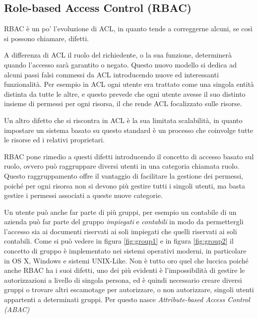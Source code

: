 \subsection*{Role-based Access Control (RBAC)} %
\label{sub:role_based_access_control}

RBAC è un po' l'evoluzione di ACL, in quanto tende a correggerne alcuni, se così si possono chiamare, difetti. \par
A differenza di ACL il ruolo del richiedente, o la sua funzione, determinerà quando l'accesso sarà garantito o negato.
Questo nuovo modello si dedica ad alcuni passi falsi commessi da ACL introducendo nuove ed interessanti funzionalità. Per esempio in ACL ogni utente era trattato come una singola entità distinta da tutte le altre, e questo prevede che ogni utente avesse il suo distinto insieme di permessi per ogni risorsa, il che rende ACL focalizzato sulle risorse. \par
Un altro difetto che si riscontra in ACL è la sua limitata scalabilità, in quanto 
impostare un sistema basato su questo standard è un processo che coinvolge tutte le risorse ed i relativi proprietari.\\ \par
RBAC pone rimedio a questi difetti introducendo il concetto di accesso basato sul ruolo, ovvero può raggruppare diversi utenti in una categoria chiamata ruolo. 
Questo raggruppamento offre il vantaggio di facilitare la gestione dei permessi, poiché per ogni risorsa non si devono più gestire tutti i singoli utenti, ma basta gestire i permessi associati a queste nuove categorie.\\ \par
Un utente può anche far parte di più gruppi, per esempio un contabile di un azienda può far parte del gruppo \textit{impiegati} e \textit{contabili} in modo da permettergli l'accesso sia ai documenti riservati ai soli impiegati che quelli riservati ai soli contabili.
Come si può vedere in figura \ref{fig:group1} e in figura \ref{fig:group2} il concetto di gruppo è implementato nei sistemi operativi moderni, in particolare in OS X, Windows e sistemi UNIX-Like.
Non è tutto oro quel che luccica poiché anche RBAC ha i suoi difetti, uno dei più evidenti è l'impossibilità di gestire le autorizzazioni a livello di singola persona, ed è quindi necessario creare diversi gruppi o trovare altri escamotage per autorizzare, o non autorizzare, singoli utenti appartenti a determinati gruppi. Per questo nasce \textit{Attribute-based Access Control (ABAC)}

